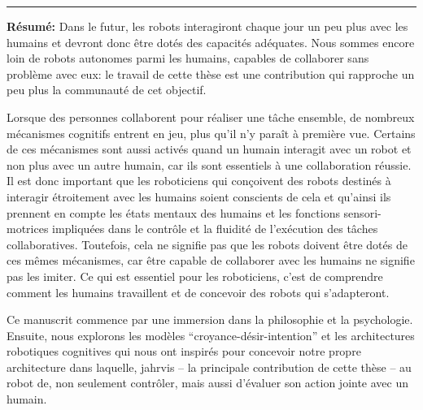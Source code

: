 \documentclass[english,a4paper,11pt,twoside]{StyleThese}
\begin{document}



\newpage
\listoftodos[Notes]


\appendix
{}






%



\cleardoublepage
\thispagestyle{empty}
\begin{vcenterpage}
\noindent\rule{\textwidth}{0.5pt}

\textbf{Résumé:} Dans le futur, les robots interagiront chaque jour un peu plus avec les humains et devront donc être dotés des capacités adéquates. Nous sommes encore loin de robots autonomes parmi les humains, capables de collaborer sans problème avec eux: le travail de cette thèse est une contribution qui rapproche un peu plus la communauté de cet objectif. 

Lorsque des personnes collaborent pour réaliser une tâche ensemble, de nombreux mécanismes cognitifs entrent en jeu, plus qu’il n’y paraît à première vue. Certains de ces mécanismes sont aussi activés quand un humain interagit avec un robot et non plus avec un autre humain, car ils sont essentiels à une collaboration réussie. Il est donc important que les roboticiens qui conçoivent des robots destinés à interagir étroitement avec les humains soient conscients de cela et qu’ainsi ils prennent en compte les états mentaux des humains et les fonctions sensori-motrices impliquées dans le contrôle et la fluidité de l'exécution des tâches collaboratives. Toutefois, cela ne signifie pas que les robots doivent être dotés de ces mêmes mécanismes, car être capable de collaborer avec les humains ne signifie pas les imiter. Ce qui est essentiel pour les roboticiens, c'est de comprendre comment les humains travaillent et de concevoir des robots qui s'adapteront. 

Ce manuscrit commence par une immersion dans la philosophie et la psychologie. Ensuite, nous explorons les modèles ``croyance-désir-intention'' et les architectures robotiques cognitives qui nous ont inspirés pour concevoir notre propre architecture dans laquelle, \acrshort{jahrvis} -- la principale contribution de cette thèse -- au robot de, non seulement contrôler, mais aussi d'évaluer son action jointe avec un humain. 


\end{vcenterpage}
\end{document}
